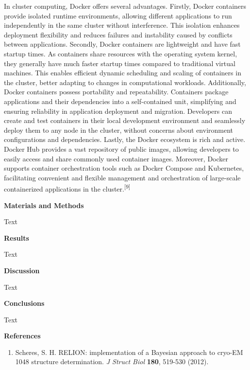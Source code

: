 \documentclass[
]{article}
\begin{document}
In cluster computing, Docker offers several advantages. Firstly, Docker
containers provide isolated runtime environments, allowing different
applications to run independently in the same cluster without
interference. This isolation enhances deployment flexibility and reduces
failures and instability caused by conflicts between applications.
Secondly, Docker containers are lightweight and have fast startup times.
As containers share resources with the operating system kernel, they
generally have much faster startup times compared to traditional virtual
machines. This enables efficient dynamic scheduling and scaling of
containers in the cluster, better adapting to changes in computational
workloads. Additionally, Docker containers possess portability and
repeatability. Containers package applications and their dependencies
into a self-contained unit, simplifying and ensuring reliability in
application deployment and migration. Developers can create and test
containers in their local development environment and seamlessly deploy
them to any node in the cluster, without concerns about environment
configurations and dependencies. Lastly, the Docker ecosystem is rich
and active. Docker Hub provides a vast repository of public images,
allowing developers to easily access and share commonly used container
images. Moreover, Docker supports container orchestration tools such as
Docker Compose and Kubernetes, facilitating convenient and flexible
management and orchestration of large-scale containerized applications
in the cluster.\textsuperscript{{[}9{]}}

\textbf{\hfill\break
}

\textbf{Materials and Methods}

Text

\textbf{\hfill\break
}

\textbf{Results}

Text

\textbf{\hfill\break
}

\textbf{Discussion}

Text

\textbf{\hfill\break
}

\textbf{Conclusions}

Text

\textbf{\hfill\break
}

\textbf{References}

\begin{enumerate}
\def\labelenumi{\arabic{enumi}.}
\item
  Scheres, S. H. RELION: implementation of a Bayesian approach to
  cryo-EM 1048 structure determination. \emph{J Struct Biol}
  \textbf{180}, 519-530 (2012).
\end{enumerate}
\end{document}
